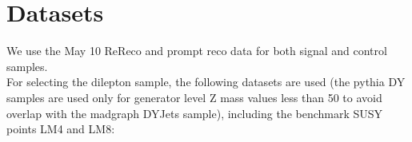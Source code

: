 
\section{Datasets}
\label{sec:datasets}


We use the May 10 ReReco and prompt reco data for both signal and control samples.%
\\
For selecting the dilepton sample, the following datasets are used (the pythia DY samples are used only for generator level Z mass values less than 50 to avoid overlap with the madgraph DYJets sample), including the benchmark SUSY points LM4 and LM8:


